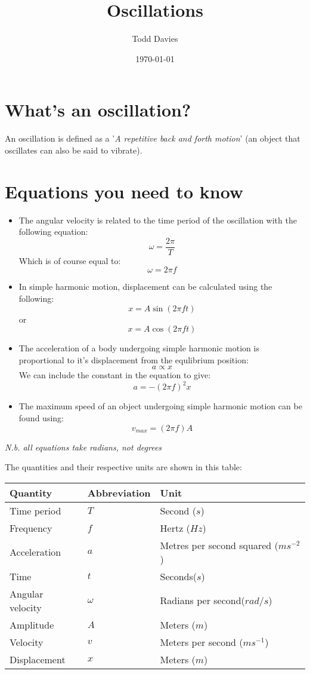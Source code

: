 \documentclass{article}
\title{Oscillations}
\author{Todd Davies}
\date{\today}
\begin{document}
\lhead{\today}

\maketitle

\section*{What's an oscillation?}
\thispagestyle{empty}
An oscillation is defined as a '\textit{A repetitive back and forth motion}' (an object that oscillates can also be said to vibrate).

\section*{Equations you need to know}
\begin{itemize}
	\item The angular velocity is related to the time period of the oscillation with the following equation:
	\[
		\omega = \frac{2 \pi}{T}
	\]
	Which is of course equal to:
	\[
	 \omega = 2 \pi f
	\]
	\item In simple harmonic motion, displacement can be calculated using the following:
	\[
		x = A \sin (2 \pi ft)
	\]
	or
	\[
		x = A \cos(2 \pi ft)
	\]
	\item The acceleration of a body undergoing simple harmonic motion is proportional to it's displacement from the equlibrium position:
	\[
		a \propto x
	\]
	We can include the constant in the equation to give:
	\[
		a = -(2 \pi f)^{2}x
	\]
	\item The maximum speed of an object undergoing simple harmonic motion can be found using:
	\[
		v_{max} = (2 \pi f)A
	\]
\end{itemize}

\textit{N.b. all equations take radians, not degrees}

The quantities and their respective units are shown in this table:

\begin{center}
	\begin{tabular}{|l|l|l|}
		\hline
			Quantity & Abbreviation & Unit \\ \hline
			Time period & $T$ & Second ($s$) \\ \hline
			Frequency & $f$ & Hertz ($Hz$) \\ \hline
			Acceleration & $a$ & Metres per second squared ($ms^{-2}$) \\ \hline
			Time & $t$ & Seconds($s$) \\ \hline
			Angular velocity & $\omega$ & Radians per second($rad/s$) \\ \hline
			Amplitude & $A$ & Meters ($m$) \\ \hline
			Velocity & $v$ & Meters per second ($ms^{-1}$) \\ \hline
			Displacement & $x$ & Meters ($m$) \\ \hline
	\end{tabular}
\end{center}
\end{document}
